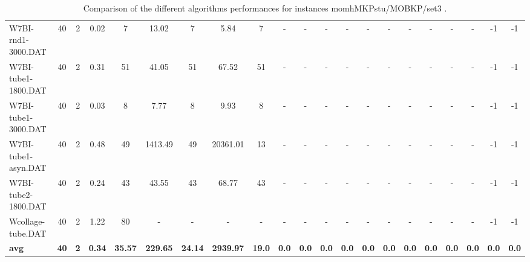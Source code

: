 \begin{sidewaystable}[!ht]
{\begin{tabular}{lcccccccccccccccccccc}
W7BI-rnd1-3000.DAT & 40 & 2 &  \textcolor{blue2}{0.02} & 7 & 13.02 & 7 & 5.84 & 7 &  - &  - &  - &  - &  - &  - &  - &  - &  - &  - & -1 & -1 \\
W7BI-tube1-1800.DAT & 40 & 2 &  \textcolor{blue2}{0.31} & 51 & 41.05 & 51 & 67.52 & 51 &  - &  - &  - &  - &  - &  - &  - &  - &  - &  - & -1 & -1 \\
W7BI-tube1-3000.DAT & 40 & 2 &  \textcolor{blue2}{0.03} & 8 & 7.77 & 8 & 9.93 & 8 &  - &  - &  - &  - &  - &  - &  - &  - &  - &  - & -1 & -1 \\
W7BI-tube1-asyn.DAT & 40 & 2 &  \textcolor{blue2}{0.48} & 49 & 1413.49 & 49 & 20361.01 & 13 &  - &  - &  - &  - &  - &  - &  - &  - &  - &  - & -1 & -1 \\
W7BI-tube2-1800.DAT & 40 & 2 &  \textcolor{blue2}{0.24} & 43 & 43.55 & 43 & 68.77 & 43 &  - &  - &  - &  - &  - &  - &  - &  - &  - &  - & -1 & -1 \\
Wcollage-tube.DAT & 40 & 2 &  \textcolor{blue2}{1.22} & 80 &  - &  - &  - &  - &  - &  - &  - &  - &  - &  - &  - &  - &  - &  - & -1 & -1 \\
\cline{1-21} \textbf{avg} & \textbf{40} & \textbf{2} & \textbf{0.34} & \textbf{35.57} & \textbf{229.65} & \textbf{24.14} & \textbf{2939.97} & \textbf{19.0} & \textbf{0.0} & \textbf{0.0} & \textbf{0.0} & \textbf{0.0} & \textbf{0.0} & \textbf{0.0} & \textbf{0.0} & \textbf{0.0} & \textbf{0.0} & \textbf{0.0} & \textbf{0.0} & \textbf{0.0} \\ \cline{1-21}
\bottomrule
\end{tabular}
}%
\caption{Comparison of the different algorithms performances for instances momhMKPstu/MOBKP/set3 .}
\label{tab:table_compare_momhMKPstu/MOBKP/set3 }
\end{sidewaystable}
